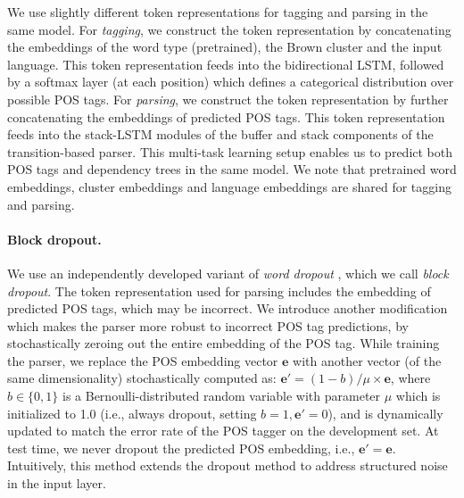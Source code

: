 \documentclass[11pt]{article}
\begin{document}
We use slightly different token representations for tagging and parsing in the same model.
For \textit{tagging}, we construct the token representation by concatenating the embeddings of the word type (pretrained), the Brown cluster and the input language.
This token representation feeds into the bidirectional LSTM, followed by a softmax layer (at each position) which defines a categorical distribution over possible POS tags.
For \textit{parsing}, we construct the token representation by further concatenating the embeddings of predicted POS tags.
This token representation feeds into the stack-LSTM modules of the buffer and stack components of the transition-based parser.
This multi-task learning setup enables us to predict both POS tags and dependency trees in the same model.
We note that pretrained word embeddings, cluster embeddings and language embeddings are shared for tagging and parsing.

\paragraph{Block dropout.}
We use an independently developed variant of \textit{word dropout} \cite{iyyer:15}, which we call \textit{block dropout}.
The token representation used for parsing includes the embedding of predicted POS tags, which may be incorrect.
We introduce another modification which makes the parser more robust to incorrect POS tag predictions, by stochastically zeroing out the entire embedding of the POS tag.
While training the parser, we replace the POS embedding vector $\mathbf{e}$ with another vector (of the same dimensionality) stochastically computed as: $\mathbf{e'} = (1-b)/\mu \times \mathbf{e}$,
where $b \in \{0,1\}$ is a Bernoulli-distributed random variable with parameter $\mu$ which is initialized to 1.0 (i.e., always dropout, setting $b=1, \mathbf{e'} = 0$), and is dynamically updated to match the error rate of the POS tagger on the development set.
At test time, we never dropout the predicted POS embedding, i.e., $\mathbf{e'}=\mathbf{e}$.
Intuitively, this method extends the dropout method \cite{srivastava:14} to address structured noise in the input layer.
\end{document}
